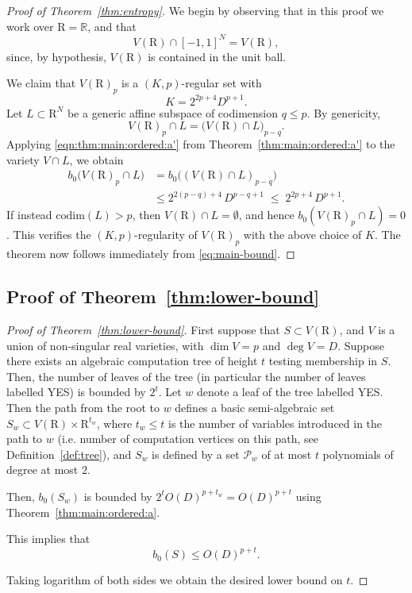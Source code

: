\documentclass[10pt]{amsart}
\theoremstyle{definition}
\theoremstyle{remark}
\numberwithin{equation}{section}
\newcommand {\R} {\mathrm{R}}
\begin{document}
\begin{proof}[Proof of Theorem~\ref{thm:entropy}]
We begin by observing that in this proof we work over $\R=\mathbb R$, and that
\[
V(\R)\cap[-1,1]^N = V(\R),
\]
since, by hypothesis, $V(\R)$ is contained in the unit ball.

We claim that $V(\R)_p$ is a $(K,p)$-regular set with
\[
K = 2^{2p+4}D^{p+1}.
\]
Let $L\subset \R^N$ be a generic affine subspace of codimension $q\le p$.
By genericity,
\[
V(\R)_p\cap L = \bigl(V(\R)\cap L\bigr)_{p-q}.
\]
Applying \eqref{eqn:thm:main:ordered:a'} from Theorem~\ref{thm:main:ordered:a'} to the variety
$V\cap L$, we obtain
\begin{align*}
b_0\bigl(V(\R)_p\cap L\bigr)
&= b_0\bigl((V(\R)\cap L)_{p-q}\bigr) \\
&\le 2^{2(p-q)+4}\,D^{p-q+1}
\;\le\; 2^{2p+4}\,D^{p+1}.
\end{align*}
If instead $\mathrm{codim}(L)>p$, then $V(\R)\cap L=\emptyset$, and hence
$b_0(V(\R)_p\cap L)=0$.  This verifies the $(K,p)$-regularity of $V(\R)_p$ with the above
choice of $K$.  The theorem now follows immediately from \eqref{eq:main-bound}.
\end{proof}


\subsection{Proof of Theorem~\ref{thm:lower-bound}}

\begin{proof}[Proof of Theorem~\ref{thm:lower-bound}]
    First suppose that $S \subset V(\R)$, and $V$ is a union of non-singular real varieties, with $\dim V = p$ and $\deg V = D$. Suppose there exists an algebraic computation tree of height $t$ testing membership in $S$. Then, the number of leaves of the tree (in particular the number of leaves labelled YES) is bounded by $2^t$. Let $w$ denote a leaf of the tree labelled YES. Then the path from the root to $w$ defines a basic semi-algebraic set $S_w \subset V(\R) \times \R^{t_w}$,
    where $t_w \leq t$ is the number of variables introduced in the path to $w$ (i.e. number of computation vertices on this path, see Definition~\ref{def:tree}), and $S_w$ is defined by a set $\mathcal{P}_w$ of at most $t$ polynomials of degree at most $2$.  
    

    Then, $b_0(S_w)$ is bounded by 
    $2^t O(D)^{p+t_w} = O(D)^{p+t}$  using Theorem~\ref{thm:main:ordered:a}.

    This implies that 
    \[
    b_0(S) \leq O(D)^{p+t}.
    \]
    
    Taking logarithm of both sides we obtain the desired lower bound on $t$.
\end{proof}
\end{document}
